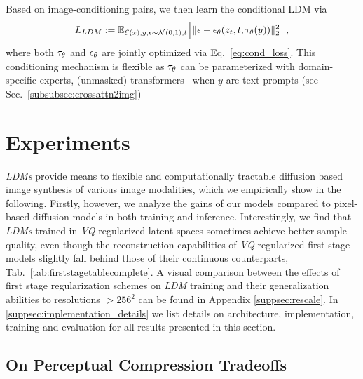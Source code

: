 \documentclass[10pt,twocolumn,letterpaper]{article}
\begin{document}
Based on image-conditioning pairs, we then learn the conditional LDM via
\begin{equation}
L_{LDM} := \mathbb{E}_{\mathcal{E}(x), y, \epsilon \sim \mathcal{N}(0, 1), t }\Big[ \Vert \epsilon - \epsilon_\theta(z_{t},t, \tau_\theta(y)) \Vert_{2}^{2}\Big] \, ,
\label{eq:cond_loss}
\end{equation}
where 
%
both $\tau_\theta$ and $\epsilon_\theta$ are jointly optimized via Eq.~\ref{eq:cond_loss}.
This conditioning mechanism is flexible as %
%
$\tau_\theta$ can be parameterized with domain-specific experts, 
\eg (unmasked) transformers~\cite{DBLP:conf/nips/VaswaniSPUJGKP17} when $y$ are
text prompts (see Sec.~\ref{subsubsec:crossattn2img})%
%
%
%
%
%
%

%
%
%
%
%
%
%


%
%
%
%
%
%
%
%
%
%
%
%
%
%
%
%
%
%
%
%
%
%
%

%

\section{Experiments}
\label{sec:experiments}
\newtexttoimagesamples
\cincompression
\speeeeed
%
\vspace{-0.5em}
\emph{LDMs} provide means to flexible and computationally tractable diffusion based image synthesis
%
 of various image modalities, which we empirically show in the following. 
Firstly, however, we analyze the gains of our models compared to pixel-based diffusion models in both training and inference. 
Interestingly, we find that \emph{LDMs} trained in \emph{VQ}-regularized latent spaces sometimes achieve better sample quality, even though the reconstruction capabilities of \emph{VQ}-regularized first stage models slightly fall behind those of their continuous counterparts, \cf Tab.~\ref{tab:firststagetablecomplete}. 
%
%
A visual comparison between the effects of first stage regularization schemes on \emph{LDM} training and their generalization abilities to resolutions $>256^2$ can be found in Appendix \ref{suppsec:rescale}. In \ref{suppsec:implementation_details} we list details on architecture, implementation, training and evaluation for all results presented in this section.
%
%
%
%
%
%
%
%
%
%
%
%
%

%
%
\subsection{On Perceptual Compression Tradeoffs}
\label{subsec:reduced_compute}
%
%
\end{document}
